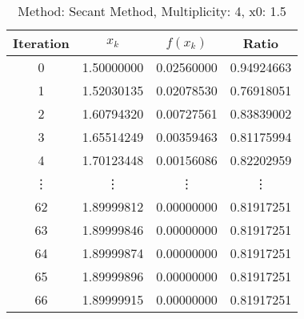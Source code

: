 \begin{table}
\centering
\caption{Method: Secant Method, Multiplicity: 4, x0: 1.5}
\label{tab:table_Secant_Method_4_1_5}
\begin{tabular}{c c c c}
\toprule
Iteration &      $x_k$ &   $f(x_k)$ &      Ratio \\
\midrule
        0 & 1.50000000 & 0.02560000 & 0.94924663 \\
        1 & 1.52030135 & 0.02078530 & 0.76918051 \\
        2 & 1.60794320 & 0.00727561 & 0.83839002 \\
        3 & 1.65514249 & 0.00359463 & 0.81175994 \\
        4 & 1.70123448 & 0.00156086 & 0.82202959 \\
   \vdots &     \vdots &     \vdots &     \vdots \\
       62 & 1.89999812 & 0.00000000 & 0.81917251 \\
       63 & 1.89999846 & 0.00000000 & 0.81917251 \\
       64 & 1.89999874 & 0.00000000 & 0.81917251 \\
       65 & 1.89999896 & 0.00000000 & 0.81917251 \\
       66 & 1.89999915 & 0.00000000 & 0.81917251 \\
\bottomrule
\end{tabular}
\end{table}
